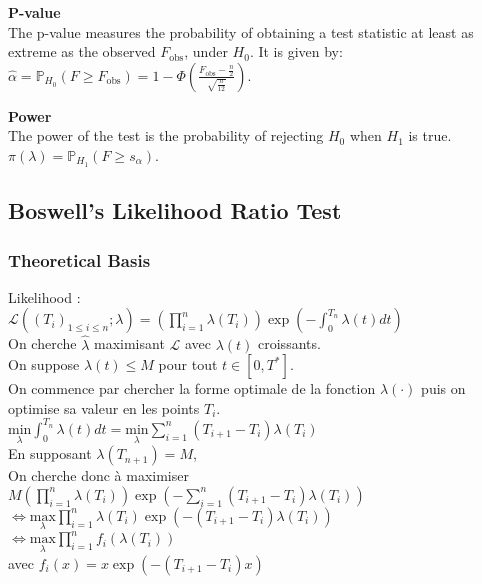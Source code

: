 \documentclass{journalstyle}
\begin{document}
\noindent\textbf{P-value} \\
The p-value measures the probability of obtaining a test statistic at least as extreme as the observed $F_{\text{obs}}$, under $H_0$.
It is given by: \\
$\hat{\alpha} = \mathbb{P}_{H_0}(F \geq F_{\text{obs}}) = 1 - \Phi(\frac{F_{\text{obs}} - \frac{n}{2}}{\sqrt{\frac{n}{12}}})$.

\noindent\textbf{Power} \\
The power of the test is the probability of rejecting $H_0$ when $H_1$ is true. \\
$\pi(\lambda) = \mathbb{P}_{H_1}(F \geq s_{\alpha})$.


\subsection{Boswell's Likelihood Ratio Test}

\subsubsection{Theoretical Basis}
Likelihood : \\
$\mathcal{L}((T_i)_{1 \leq i \leq n}; \lambda) = (\prod_{i=1}^n \lambda(T_i)) \exp(-\int_0^{T_n} \lambda(t) dt)$ \\
On cherche $\hat{\lambda}$ maximisant $\mathcal{L}$ avec $\lambda(t)$ croissants. \\
On suppose $\lambda(t) \leq M$ pour tout $t \in [0, T^*]$. \\

On commence par chercher la forme optimale de la fonction $\lambda(\cdot)$ puis on optimise sa valeur en les points $T_i$. \\
$\underset{\lambda}{\text{min}} \int_0^{T_n} \lambda(t) dt = \underset{\lambda}{\text{min}} \sum_{i=1}^n (T_{i+1} - T_i) \lambda(T_i)$ \\

En supposant $\lambda(T_{n+1}) = M$, \\
On cherche donc à maximiser \\
$M(\prod_{i=1}^{n} \lambda(T_i)) \exp(-\sum_{i=1}^{n} (T_{i+1} - T_i) \lambda(T_i))$ \\
$\Leftrightarrow \underset{\lambda}{\text{max}} \prod_{i=1}^{n} \lambda(T_i) \exp(-(T_{i+1} - T_i) \lambda(T_i))$ \\
$\Leftrightarrow \underset{\lambda}{\text{max}} \prod_{i=1}^{n} f_i(\lambda(T_i))$ \\
avec $f_i(x) = x \exp(-(T_{i+1} - T_i) x)$ \\
\end{document}
